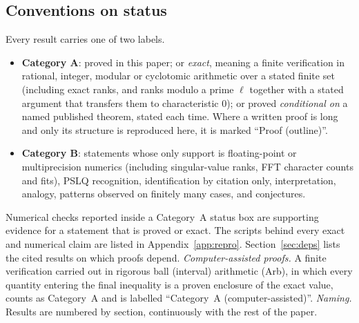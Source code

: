 \subsection{Conventions on status}\label{sec:cat}
Every result carries one of two labels.
\begin{itemize}[leftmargin=2em]
\item \textbf{Category A}: proved in this paper; or \emph{exact}, meaning a finite verification in rational, integer, modular or cyclotomic arithmetic over
a stated finite set (including exact ranks, and ranks modulo a prime $\ell$ together with a stated argument that transfers them to characteristic $0$);
or proved \emph{conditional on} a named published theorem, stated each time. Where a written proof is long and only its structure is reproduced here,
it is marked ``Proof (outline)''.
\item \textbf{Category B}: statements whose only support is floating-point or multiprecision numerics (including singular-value ranks, FFT character
counts and fits), PSLQ recognition, identification by citation only, interpretation, analogy, patterns observed on finitely many cases, and conjectures.
\end{itemize}
Numerical checks reported inside a Category~A status box are supporting evidence for a statement that is proved or exact. The scripts behind every
exact and numerical claim are listed in Appendix~\ref{app:repro}. Section~\ref{sec:deps} lists the cited results on which proofs depend.
\emph{Computer-assisted proofs.} A finite verification carried out in rigorous ball (interval) arithmetic (Arb), in which every quantity entering the final inequality is a proven enclosure of the exact value, counts as Category~A and is labelled ``Category~A (computer-assisted)''.
\emph{Naming.} Results are numbered by section, continuously with the rest of the paper.

